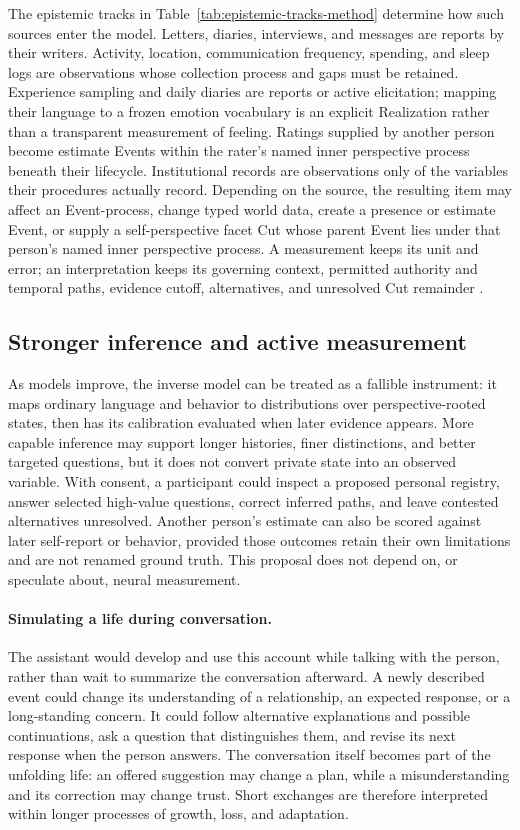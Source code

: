 \documentclass[10pt]{article}
\begin{document}
The epistemic tracks in Table~\ref{tab:epistemic-tracks-method} determine how
such sources enter the model. Letters, diaries, interviews, and messages are
reports by their writers. Activity, location, communication frequency,
spending, and sleep logs are observations whose collection process and gaps
must be retained. Experience sampling and daily diaries are reports or active
elicitation; mapping their language to a frozen emotion vocabulary is an
explicit Realization rather than a transparent measurement of feeling.
Ratings supplied by another person become estimate Events within the rater's
named inner perspective process beneath their lifecycle. Institutional
records are observations only of the variables their procedures actually
record. Depending on the source, the resulting item may affect an Event-process,
change typed world data, create a presence or estimate Event, or supply a
self-perspective facet Cut whose parent Event lies under that person's named
inner perspective process. A
measurement keeps its unit and error; an interpretation keeps its governing
context, permitted authority and temporal paths, evidence cutoff,
alternatives, and unresolved Cut remainder
\cite{shiffman2008,ponnada2022,burns2011mobilyze}.

\subsection{Stronger inference and active measurement}

As models improve, the inverse model can be treated as a fallible instrument:
it maps ordinary language and behavior to distributions over perspective-rooted
states, then has its calibration evaluated when later evidence appears. More
capable inference may support longer histories, finer distinctions, and better
targeted questions, but it does not convert private state into an observed
variable. With consent, a participant could inspect a proposed personal
registry, answer selected high-value questions, correct inferred paths, and
leave contested alternatives unresolved. Another person's estimate can also be
scored against later self-report or behavior, provided those outcomes retain
their own limitations and are not renamed ground truth. This proposal does not
depend on, or speculate about, neural measurement.

\paragraph{Simulating a life during conversation.}
The assistant would develop and use this account while talking with the
person, rather than wait to summarize the conversation afterward. A newly
described event could change its understanding of a relationship, an expected
response, or a long-standing concern. It could follow alternative explanations
and possible continuations, ask a question that distinguishes them, and revise
its next response when the person answers. The conversation itself becomes
part of the unfolding life: an offered suggestion may change a plan, while a
misunderstanding and its correction may change trust. Short exchanges are
therefore interpreted within longer processes of growth, loss, and adaptation.
\end{document}
